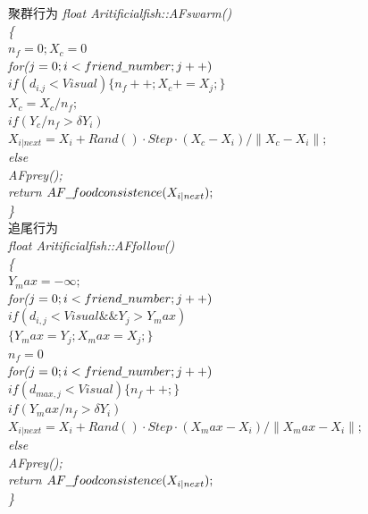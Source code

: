 \documentclass[a4paper, 11pt]{article}
\begin{document}
\begin{section}
\begin{subsection}
		\small{聚群行为}\vspace{3ex}
			\flushleft\scriptsize{\emph{float Aritificial\underline{\hspace{0.5em}}fish::AF\underline{\hspace{0.5em}}swarm() \\ {\{} \\ {\qquad $n_f=0;X_c=0$} \\ {\qquad for($j=0;i<friend\underline{\hspace{0.5em}}number;j++)$} \\ {\qquad\qquad $if(d_{i.j}<Visual) \{ n_f++;X_c+=X_j;\}$} \\ {\qquad $X_c=X_c/n_f;$}\\{\qquad $if (Y_c/n_f>\delta Y_i)$}\\{\qquad\qquad $X_{i|next}=X_i+Rand()·Step·(X_c-X_i)/\lVert X_c-X_i\rVert;$}\\{\qquad else}\\{\qquad\qquad AF\underline{\hspace{0.5em}}prey();}\\{ return $AF\underline{\hspace{0.5em}}foodconsistence(X_{i|next});$} \\{\}} }}\\
		\small{追尾行为}\vspace{3ex}\\
			\flushleft\scriptsize{\emph{float Aritificial\underline{\hspace{0.5em}}fish::AF\underline{\hspace{0.5em}}follow() \\ {\{} \\ {\qquad $Y_max=-\infty;$} \\ {\qquad for($j=0;i<friend\underline{\hspace{0.5em}}number;j++)$} \\ {\qquad\qquad $if(d_{i,j}<Visual \&\& Y_j>Y_max)$} \\ {\qquad\qquad\qquad $\{ Y_max=Y_j; X_max=X_j; \}$ }\\{\qquad $n_f=0$}\\{\qquad for($j=0;i<friend\underline{\hspace{0.5em}}number;j++)$}\\{\qquad\qquad $if(d_{max,j}<Visual) \{ n_f++;\} $}\\{\qquad $if (Y_max/n_f>\delta Y_i)$}\\{\qquad\qquad $X_{i|next}=X_i+Rand()·Step·(X_max-X_i)/\lVert X_max-X_i\rVert;$}\\{\qquad else}\\{\qquad\qquad AF\underline{\hspace{0.5em}}prey();}\\{ return $AF\underline{\hspace{0.5em}}foodconsistence(X_{i|next});$} \\{\}} }}\\

\end{subsection}
\end{section}
\end{document}
